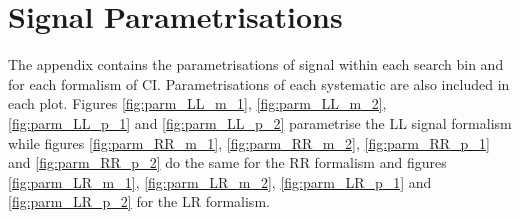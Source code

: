 \chapter{Signal Parametrisations}
	\label{ap:parm}

The appendix contains the parametrisations of signal within each search bin and for each formalism of CI. Parametrisations of each systematic are also included in each plot. Figures \ref{fig:parm_LL_m_1}, \ref{fig:parm_LL_m_2}, \ref{fig:parm_LL_p_1} and \ref{fig:parm_LL_p_2} parametrise the LL signal formalism while figures \ref{fig:parm_RR_m_1}, \ref{fig:parm_RR_m_2}, \ref{fig:parm_RR_p_1} and \ref{fig:parm_RR_p_2} do the same for the RR formalism and figures \ref{fig:parm_LR_m_1}, \ref{fig:parm_LR_m_2}, \ref{fig:parm_LR_p_1} and \ref{fig:parm_LR_p_2} for the LR formalism.




